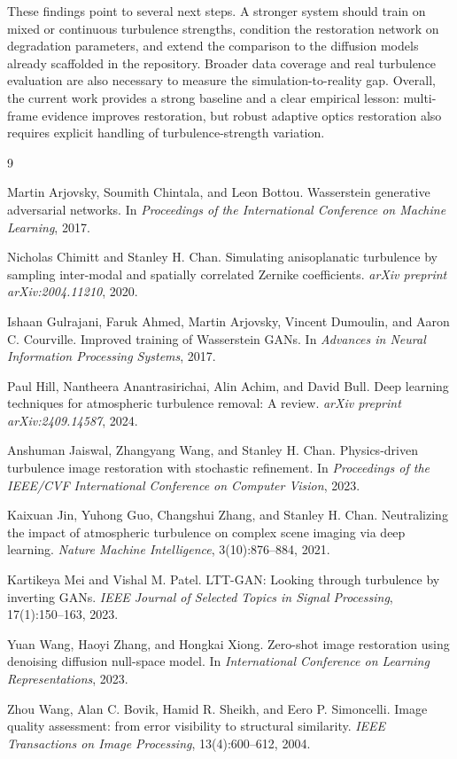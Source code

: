 \documentclass{article}
\begin{document}
These findings point to several next steps. A stronger system should train on mixed or continuous turbulence strengths, condition the restoration network on degradation parameters, and extend the comparison to the diffusion models already scaffolded in the repository. Broader data coverage and real turbulence evaluation are also necessary to measure the simulation-to-reality gap. Overall, the current work provides a strong baseline and a clear empirical lesson: multi-frame evidence improves restoration, but robust adaptive optics restoration also requires explicit handling of turbulence-strength variation.

\begin{thebibliography}{9}

Martin Arjovsky, Soumith Chintala, and Leon Bottou.
Wasserstein generative adversarial networks.
In \emph{Proceedings of the International Conference on Machine Learning}, 2017.

Nicholas Chimitt and Stanley H. Chan.
Simulating anisoplanatic turbulence by sampling inter-modal and spatially correlated Zernike coefficients.
\emph{arXiv preprint arXiv:2004.11210}, 2020.

Ishaan Gulrajani, Faruk Ahmed, Martin Arjovsky, Vincent Dumoulin, and Aaron C. Courville.
Improved training of Wasserstein GANs.
In \emph{Advances in Neural Information Processing Systems}, 2017.

Paul Hill, Nantheera Anantrasirichai, Alin Achim, and David Bull.
Deep learning techniques for atmospheric turbulence removal: A review.
\emph{arXiv preprint arXiv:2409.14587}, 2024.

Anshuman Jaiswal, Zhangyang Wang, and Stanley H. Chan.
Physics-driven turbulence image restoration with stochastic refinement.
In \emph{Proceedings of the IEEE/CVF International Conference on Computer Vision}, 2023.

Kaixuan Jin, Yuhong Guo, Changshui Zhang, and Stanley H. Chan.
Neutralizing the impact of atmospheric turbulence on complex scene imaging via deep learning.
\emph{Nature Machine Intelligence}, 3(10):876--884, 2021.

Kartikeya Mei and Vishal M. Patel.
LTT-GAN: Looking through turbulence by inverting GANs.
\emph{IEEE Journal of Selected Topics in Signal Processing}, 17(1):150--163, 2023.

Yuan Wang, Haoyi Zhang, and Hongkai Xiong.
Zero-shot image restoration using denoising diffusion null-space model.
In \emph{International Conference on Learning Representations}, 2023.

Zhou Wang, Alan C. Bovik, Hamid R. Sheikh, and Eero P. Simoncelli.
Image quality assessment: from error visibility to structural similarity.
\emph{IEEE Transactions on Image Processing}, 13(4):600--612, 2004.

\end{thebibliography}
\end{document}
